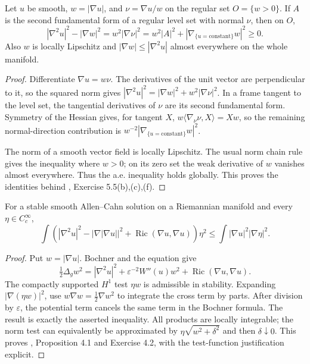 \begin{lemma}\label{lem:phase-level-geometry}
Let $u$ be smooth, $w=|\nabla u|$, and $\nu=\nabla u/w$ on the regular set $O=\{w>0\}$. If $A$ is the second fundamental form of a regular level set with normal $\nu$, then on $O$,
\[
 |\nabla^2u|^2-|\nabla w|^2
 =w^2|\nabla\nu|^2
 =w^2|A|^2+|\nabla_{\{u=\mathrm{constant}\}}w|^2\geq0.
\]
Also $w$ is locally Lipschitz and $|\nabla w|\leq|\nabla^2u|$ almost everywhere on the whole manifold.
\end{lemma}
\begin{proof}
Differentiate $\nabla u=w\nu$. The derivatives of the unit vector are perpendicular to it, so the squared norm gives $|\nabla^2u|^2=|\nabla w|^2+w^2|\nabla\nu|^2$. In a frame tangent to the level set, the tangential derivatives of $\nu$ are its second fundamental form. Symmetry of the Hessian gives, for tangent $X$, $w\langle\nabla_\nu\nu,X\rangle=Xw$, so the remaining normal-direction contribution is $w^{-2}|\nabla_{\{u=\mathrm{constant}\}}w|^2$.

The norm of a smooth vector field is locally Lipschitz. The usual norm chain rule gives the inequality where $w>0$; on its zero set the weak derivative of $w$ vanishes almost everywhere. Thus the a.e. inequality holds globally. This proves the identities behind \cite{ChAC}, Exercise 5.5(b),(c),(f).
\end{proof}

\begin{theorem}\label{thm:phase-geometric-stability}
For a stable smooth Allen--Cahn solution on a Riemannian manifold and every $\eta\in C_c^\infty$,
\[
 \int\left(|\nabla^2u|^2-|\nabla|\nabla u||^2+
 \operatorname{Ric}(\nabla u,\nabla u)\right)\eta^2
 \leq\int|\nabla u|^2|\nabla\eta|^2.
\]
\end{theorem}
\begin{proof}
Put $w=|\nabla u|$. Bochner and the equation give
\[
 \tfrac12\Delta_g w^2=|\nabla^2u|^2+
 \varepsilon^{-2}W''(u)w^2+\operatorname{Ric}(\nabla u,\nabla u).
\]
The compactly supported $H^1$ test $\eta w$ is admissible in stability. Expanding $|\nabla(\eta w)|^2$, use $w\nabla w=\tfrac12\nabla w^2$ to integrate the cross term by parts. After division by $\varepsilon$, the potential term cancels the same term in the Bochner formula. The result is exactly the asserted inequality. All products are locally integrable; the norm test can equivalently be approximated by $\eta\sqrt{w^2+\delta^2}$ and then $\delta\downarrow0$. This proves \cite{ChAC}, Proposition 4.1 and Exercise 4.2, with the test-function justification explicit.
\end{proof}

